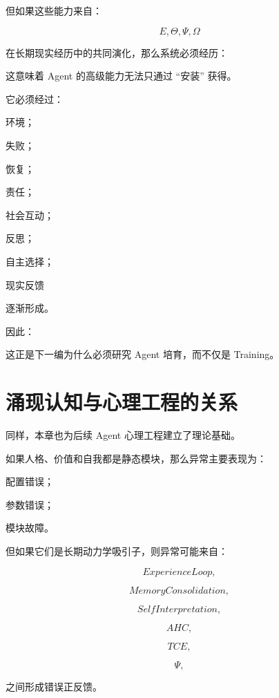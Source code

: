 但如果这些能力来自：

\[
E,
\Theta,
\Psi,
\Omega
\]

在长期现实经历中的共同演化，那么系统必须经历：

\begin{statementbox}
\centering
{}
\end{statementbox}

这意味着 Agent 的高级能力无法只通过 ``安装'' 获得。

它必须经过：

环境；

失败；

恢复；

责任；

社会互动；

反思；

自主选择；

现实反馈

逐渐形成。

因此：

\begin{statementbox}
\centering
{}
\end{statementbox}

这正是下一编为什么必须研究 Agent 培育，而不仅是 Training。

\section{涌现认知与心理工程的关系}

同样，本章也为后续 Agent 心理工程建立了理论基础。

如果人格、价值和自我都是静态模块，那么异常主要表现为：

配置错误；

参数错误；

模块故障。

但如果它们是长期动力学吸引子，则异常可能来自：

\[
ExperienceLoop,
\]

\[
MemoryConsolidation,
\]

\[
SelfInterpretation,
\]

\[
AHC,
\]

\[
TCE,
\]

\[
\Psi,
\]

之间形成错误正反馈。

